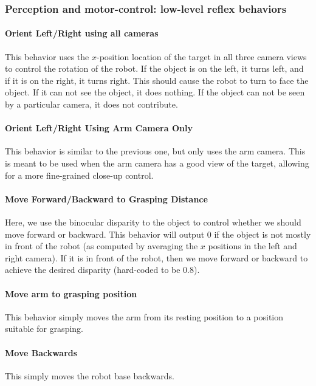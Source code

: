 \subsubsection{Perception and motor-control: low-level reflex behaviors}%
\label{ssubsec:perception_and_motor_control_low_level_reflex_behaviors}

\paragraph{Orient Left/Right using all cameras}
This behavior uses the $x$-position location of the target in all three camera views to control the rotation of the robot. 
If the object is on the left, it turns left, and if it is on the right, it turns right. 
This should cause the robot to turn to face the object. If it can not see the object, it does nothing. 
If the object can not be seen by a particular camera, it does not contribute.

\paragraph{Orient Left/Right Using Arm Camera Only} 
This behavior is similar to the previous one, but only uses the arm camera. 
This is meant to be used when the arm camera has a good view of the target, allowing for a more fine-grained close-up control.

\paragraph{Move Forward/Backward to Grasping Distance} 
\label{orientFB}
Here, we use the binocular disparity to the object to control whether we should move forward or backward. 
This behavior will output $0$ if the object is not mostly in front of the robot (as computed by averaging the $x$ positions in the left and right camera). 
If it is in front of the robot, then we move forward or backward to achieve the desired disparity (hard-coded to be $0.8$).

\paragraph{Move arm to grasping position} 
\label{grasppos}
This behavior simply moves the arm from its resting position to a position suitable for grasping.

\paragraph{Move Backwards} 
\label{moveback}
This simply moves the robot base backwards.

